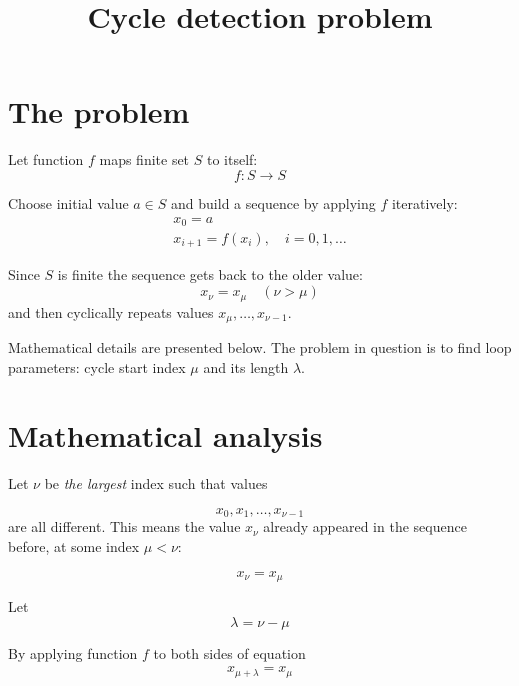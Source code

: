 \documentclass[12pt,a4paper]{article}
\begin{document}
\title{Cycle detection problem}
\author{}
\date{}
\maketitle

\section{The problem}

Let function $ f $ maps finite set $ S $ to itself: 
\begin{equation}
f: S \to S
\end{equation}

Choose initial value $ a \in S $ and build a sequence by applying $ f $ iteratively:
\begin{gather}
x_0 = a \\
x_{i+1} = f(x_i), \quad i = 0, 1, \ldots
\end{gather}

Since $ S $ is finite the sequence gets back to the older value:
\begin{equation}
x_{\nu} = x_{\mu} \quad (\nu > \mu)
\end{equation}
and then cyclically repeats values $ x_{\mu}, \ldots, x_{\nu-1} $.

Mathematical details are presented below. The problem in question is to find loop parameters: cycle start index $ \mu $ and its length $ \lambda $.

\section{Mathematical analysis}

Let $ \nu $ be \emph{the largest} index such that values

\begin{equation}
x_0, x_1, \ldots, x_{\nu-1}
\end{equation}
are all different. This means the value $ x_{\nu} $ already appeared in the sequence before, at some index $ \mu < \nu $:

\begin{equation}
x_{\nu} = x_{\mu}
\end{equation}

Let
\begin{equation}
\lambda = \nu - \mu
\end{equation}

By applying function $ f $ to both sides of equation
\begin{gather}
x_{\mu + \lambda} = x_{\mu}
\end{gather}
\end{document}
